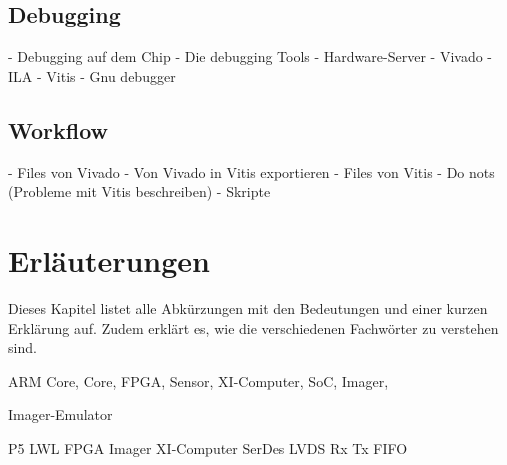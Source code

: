 \documentclass{article}
\begin{document}
\subsection{Debugging}
- Debugging auf dem Chip
- Die debugging Tools
    - Hardware-Server
    - Vivado
        - ILA
    - Vitis
        - Gnu debugger

\subsection{Workflow}
- Files von Vivado
- Von Vivado in Vitis exportieren
- Files von Vitis
- Do nots (Probleme mit Vitis beschreiben)
- Skripte


\section{Erläuterungen}
Dieses Kapitel listet alle Abkürzungen mit den Bedeutungen und einer kurzen Erklärung auf. Zudem erklärt es, wie die verschiedenen Fachwörter zu verstehen sind.

ARM Core,
Core,
FPGA,
Sensor,
XI-Computer,
SoC,
Imager,

Imager-Emulator

P5
LWL
FPGA
Imager
XI-Computer
SerDes
LVDS
Rx
Tx
FIFO
\end{document}

